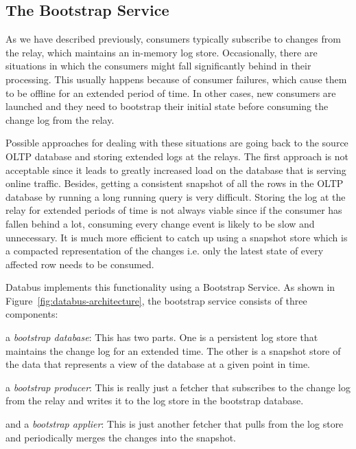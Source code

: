 \subsection{The Bootstrap Service}
\label{subsec:Bootstrap}

As we have described previously, consumers typically subscribe to changes from the relay, which maintains an in-memory log store. Occasionally, there are situations in which the consumers might fall significantly behind in their processing. This usually happens because of consumer failures, which cause them to be offline for an extended period of time. In other cases, new consumers are launched and they need to bootstrap their initial state before consuming the change log from the relay. 

Possible approaches for dealing with these situations are going back to the source OLTP database and storing extended logs at the relays. The first approach is not acceptable since it leads to greatly increased load on the database that is serving online traffic. Besides, getting a consistent snapshot of all the rows in the OLTP database by running a long running query is very difficult. Storing the log at the relay for extended periods of time is not always viable since if the consumer has fallen behind a lot, consuming every change event is likely to be slow and unnecessary. It is much more efficient to catch up using a snapshot store which is a compacted representation of the changes i.e. only the latest state of every affected row needs to be consumed. 

Databus implements this functionality using a Bootstrap Service. As shown in Figure~\ref{fig:databus-architecture}, the bootstrap service consists of three components:
\begin{itemize*}
\item a \emph{bootstrap database}: This has two parts. One is a persistent log store that maintains the change log for an extended time. The other is a snapshot store of the data that represents a view of the database at a given point in time. 
\item a \emph{bootstrap producer}: This is really just a fetcher that subscribes to the change log from the relay and writes it to the log store in the bootstrap database. 
\item and a \emph{bootstrap applier}: This is just another fetcher that pulls from the log store and periodically merges the changes into the snapshot.
\end{itemize*}

